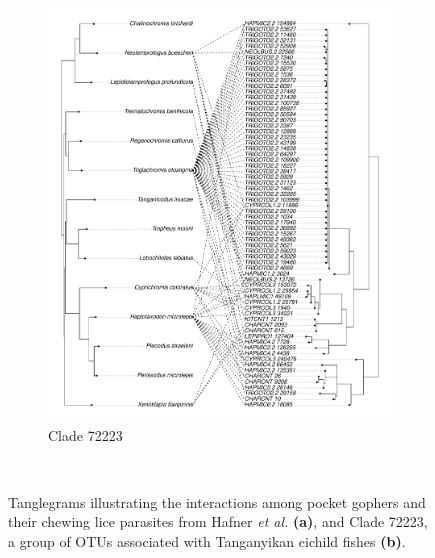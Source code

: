\begin{figure}
\begin{subfigure}[b]{0.45\textwidth}
        \includegraphics[width=\textwidth]{FishPoo/figures/codiv_clade_72223}
        \small
        \caption{Clade 72223}
    \end{subfigure}\\
    \caption{Tanglegrams illustrating the interactions among pocket gophers and their chewing lice parasites from Hafner {\em et al.} \cite{hafner1994disparate} \textbf{(a)}, and Clade 72223, a group of OTUs associated with Tanganyikan cichild fishes \textbf{(b)}.}
    \label{fig:FP_tangles}
\end{figure}